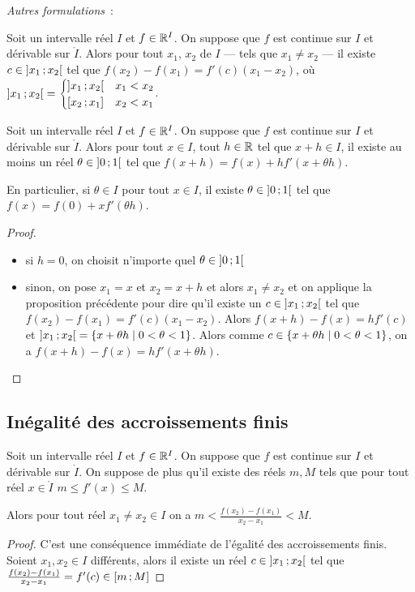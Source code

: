 \emph{Autres formulations}~:

\begin{prop}
  Soit un intervalle réel \(I\) et \(f \in \mathbb{R}^I\). On suppose que \(f\) est
  continue sur \(I\) et dérivable sur \(\mathring{I}\). Alors pour tout \(x_1\),
  \(x_2\) de \(I\) --- tels que \(x_1 \neq x_2\) --- il existe \(c \in
  \left] x_1 \, ; {} x_2 \right[\) tel que \(f(x_2)-f(x_1)=f'(c)(x_1-x_2)\), où
  \(\left] x_1 \, ; {} x_2 \right[=\begin{cases} \left] x_1 \, ; {} x_2 \right[ & x_1 < x_2\\
    \left[ x_2 \, ; {} x_1 \right] & x_2 < x_1 \end{cases}\).
\end{prop}
\begin{prop}
  Soit un intervalle réel \(I\) et \(f \in \mathbb{R}^I\). On suppose que \(f\) est
  continue sur \(I\) et dérivable sur \(\mathring{I}\). Alors pour tout \(x \in
  I\), tout \(h \in \mathbb{R}\) tel que \(x+h \in I\), il existe au moins un réel
  \(\theta \in \left] 0 \, ; {} 1 \right[\) tel que \(f(x+h)=f(x)+hf'(x+\theta h)\).

  En particulier, si \(\theta \in I\) pour tout \(x \in I\), il existe \(\theta
  \in \left] 0 \, ; {} 1 \right[\) tel que \(f(x)=f(0)+xf'(\theta h)\).
\end{prop}
\begin{proof}
  \begin{itemize}
    \item si \(h=0\), on choisit n'importe quel \(\theta \in
      \left] 0 \, ; {} 1 \right[\)
    \item sinon, on pose \(x_1=x\) et \(x_2=x+h\) et alors \(x_1 \neq x_2\) et
      on applique la proposition précédente pour dire qu'il existe un \(c \in
      \left] x_1 \, ; {} x_2 \right[\) tel que \(f(x_2)-f(x_1)=f'(c)(x_1-x_2)\). Alors
      \(f(x+h)-f(x)=hf'(c)\) et \(\left] x_1 \, ; {} x_2 \right[ = \left\{x+\theta h\mathrel{}\middle|\mathrel{}0 < \theta <
      1\right\}\). Alors comme \(c \in \left\{x+\theta h\mathrel{}\middle|\mathrel{}0 < \theta < 1\right\}\), on a
      \(f(x+h)-f(x)=hf'(x + \theta h)\).
  \end{itemize}
\end{proof}

\subsection{Inégalité des accroissements finis}

\begin{theo}[IAF]\label{theo:iaf}
  Soit un intervalle réel \(I\) et \(f \in \mathbb{R}^I\). On suppose que \(f\) est
  continue sur \(I\) et dérivable sur \(\mathring{I}\). On suppose de plus qu'il
  existe des réels \(m,M\) tels que pour tout réel \(x \in \mathring{I}\) \(m
  \leqslant f'(x) \leqslant M\).

  Alors pour tout réel \(x_1 \neq x_2 \in I\) on a \(m <
  \frac{f(x_2)-f(x_1)}{x_2-x_1} < M\).
\end{theo}
\begin{proof}
  C'est une conséquence immédiate de l'égalité des accroissements finis. Soient
  \(x_1, x_2 \in I\) différents, alors il existe un réel \(c \in 
  \left] x_1 \, ; {} x_2 \right[\)
  tel que \(\frac{f(x_2)-f(x_1)}{x_2-x_1} = f'(c) \in \left[ m \, ; {} M \right]\)
\end{proof}

